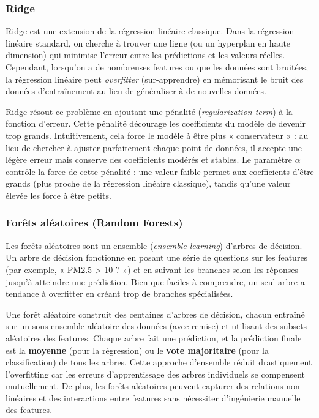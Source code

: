 \documentclass[11pt,a4paper]{article}
\begin{document}
\subsubsection{Ridge}

Ridge est une extension de la régression linéaire classique. Dans la régression linéaire standard, on cherche à trouver une ligne (ou un hyperplan en haute dimension) qui minimise l'erreur entre les prédictions et les valeurs réelles. Cependant, lorsqu'on a de nombreuses features ou que les données sont bruitées, la régression linéaire peut \textit{overfitter} (sur-apprendre) en mémorisant le bruit des données d'entraînement au lieu de généraliser à de nouvelles données.

Ridge résout ce problème en ajoutant une pénalité (\textit{regularization term}) à la fonction d'erreur. Cette pénalité décourage les coefficients du modèle de devenir trop grands. Intuitivement, cela force le modèle à être plus « conservateur » : au lieu de chercher à ajuster parfaitement chaque point de données, il accepte une légère erreur mais conserve des coefficients modérés et stables. Le paramètre $\alpha$ contrôle la force de cette pénalité : une valeur faible permet aux coefficients d'être grands (plus proche de la régression linéaire classique), tandis qu'une valeur élevée les force à être petits.

\subsubsection{Forêts aléatoires (Random Forests)}

Les forêts aléatoires sont un ensemble (\textit{ensemble learning}) d'arbres de décision. Un arbre de décision fonctionne en posant une série de questions sur les features (par exemple, « PM2.5 > 10 ? ») et en suivant les branches selon les réponses jusqu'à atteindre une prédiction. Bien que faciles à comprendre, un seul arbre a tendance à overfitter en créant trop de branches spécialisées.

Une forêt aléatoire construit des centaines d'arbres de décision, chacun entraîné sur un sous-ensemble aléatoire des données (avec remise) et utilisant des subsets aléatoires des features. Chaque arbre fait une prédiction, et la prédiction finale est la \textbf{moyenne} (pour la régression) ou le \textbf{vote majoritaire} (pour la classification) de tous les arbres. Cette approche d'ensemble réduit drastiquement l'overfitting car les erreurs d'apprentissage des arbres individuels se compensent mutuellement. De plus, les forêts aléatoires peuvent capturer des relations non-linéaires et des interactions entre features sans nécessiter d'ingénierie manuelle des features.
\end{document}

